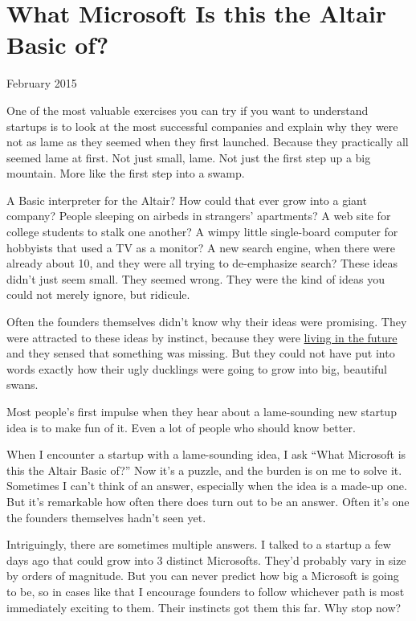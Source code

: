 \chapter{What Microsoft Is this the Altair Basic of?}

February 2015

One of the most valuable exercises you can try if you want to understand
startups is to look at the most successful companies and explain why
they were not as lame as they seemed when they first launched. Because
they practically all seemed lame at first. Not just small, lame. Not
just the first step up a big mountain. More like the first step into a
swamp.

A Basic interpreter for the Altair? How could that ever grow into a
giant company? People sleeping on airbeds in strangers' apartments? A
web site for college students to stalk one another? A wimpy little
single-board computer for hobbyists that used a TV as a monitor? A new
search engine, when there were already about 10, and they were all
trying to de-emphasize search? These ideas didn't just seem small. They
seemed wrong. They were the kind of ideas you could not merely ignore,
but ridicule.

Often the founders themselves didn't know why their ideas were
promising. They were attracted to these ideas by instinct, because they
were \href{startupideas.html}{living in the future} and they sensed that
something was missing. But they could not have put into words exactly
how their ugly ducklings were going to grow into big, beautiful swans.

Most people's first impulse when they hear about a lame-sounding new
startup idea is to make fun of it. Even a lot of people who should know
better.

When I encounter a startup with a lame-sounding idea, I ask ``What
Microsoft is this the Altair Basic of?'' Now it's a puzzle, and the
burden is on me to solve it. Sometimes I can't think of an answer,
especially when the idea is a made-up one. But it's remarkable how often
there does turn out to be an answer. Often it's one the founders
themselves hadn't seen yet.

Intriguingly, there are sometimes multiple answers. I talked to a
startup a few days ago that could grow into 3 distinct Microsofts.
They'd probably vary in size by orders of magnitude. But you can never
predict how big a Microsoft is going to be, so in cases like that I
encourage founders to follow whichever path is most immediately exciting
to them. Their instincts got them this far. Why stop now?